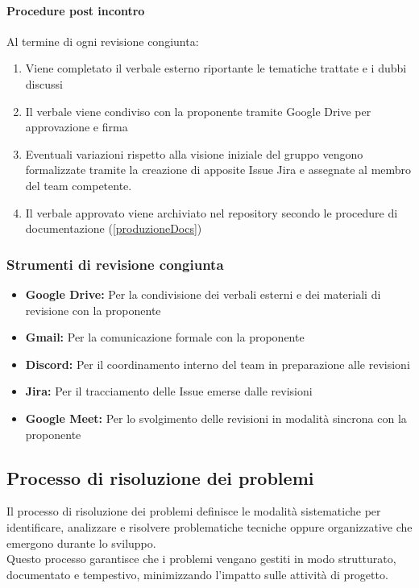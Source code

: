 \documentclass[a4paper,12pt]{article}
\begin{document}
\paragraph{Procedure post incontro}
Al termine di ogni revisione congiunta:
\begin{enumerate}
    \item Viene completato il verbale esterno riportante le tematiche trattate e i dubbi discussi 
    \item Il verbale viene condiviso con la proponente tramite Google Drive per approvazione e firma
    \item Eventuali variazioni rispetto alla visione iniziale del gruppo vengono formalizzate tramite 
    la creazione di apposite Issue Jira e assegnate al membro del team competente.
    \item Il verbale approvato viene archiviato nel repository secondo le procedure di documentazione (\ref{produzioneDocs})
\end{enumerate}

\subsubsection{Strumenti di revisione congiunta}\label{strumenti_revisione_congiunta}
\begin{itemize}
    \item \textbf{Google Drive:} Per la condivisione dei verbali esterni e dei materiali di revisione con la proponente
    \item \textbf{Gmail:} Per la comunicazione formale con la proponente
    \item \textbf{Discord:} Per il coordinamento interno del team in preparazione alle revisioni
    \item \textbf{Jira:} Per il tracciamento delle Issue emerse dalle revisioni
    \item \textbf{Google Meet:} Per lo svolgimento delle revisioni in modalità sincrona con la proponente
\end{itemize}

\subsection{Processo di risoluzione dei problemi}\label{proc_risoluzione_problemi}
Il processo di risoluzione dei problemi definisce le modalità sistematiche per identificare, analizzare e risolvere problematiche tecniche oppure organizzative 
che emergono durante lo sviluppo. \\Questo processo garantisce che i problemi vengano gestiti in modo strutturato, documentato e tempestivo, 
minimizzando l'impatto sulle attività di progetto.
\end{document}
